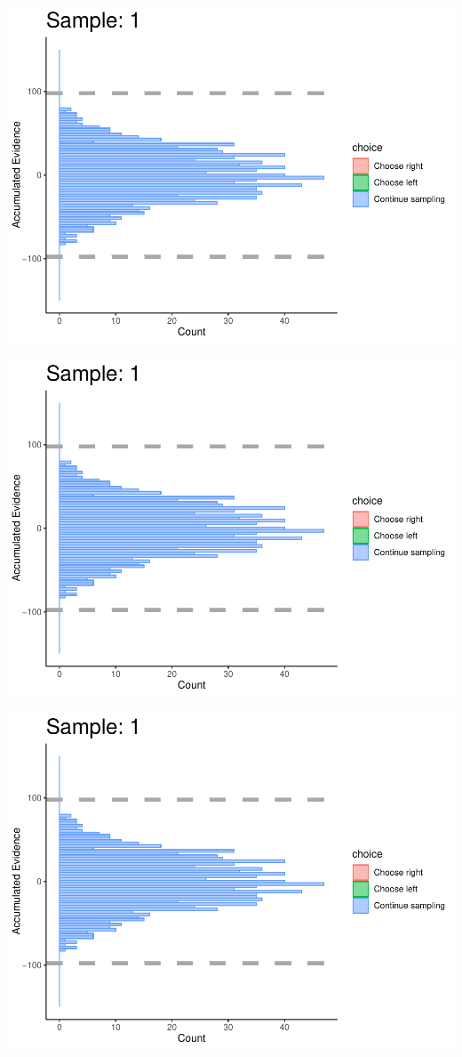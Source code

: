 \documentclass[
]{book}
\begin{document}
\begin{center}\includegraphics[width=0.8\linewidth]{LateNightBayes_files/figure-latex/collapsing_dcb-2} \end{center}

\begin{center}\includegraphics[width=0.8\linewidth]{LateNightBayes_files/figure-latex/collapsing_dcb-3} \end{center}

\begin{center}\includegraphics[width=0.8\linewidth]{LateNightBayes_files/figure-latex/collapsing_dcb-4} \end{center}
\end{document}
